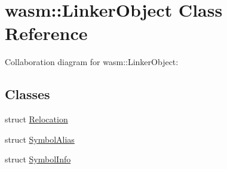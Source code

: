 \hypertarget{classwasm_1_1_linker_object}{}\section{wasm\+:\+:Linker\+Object Class Reference}
\label{classwasm_1_1_linker_object}


Collaboration diagram for wasm\+:\+:Linker\+Object\+:
\subsection*{Classes}
\begin{DoxyCompactItemize}
\item 
struct \mbox{\hyperlink{structwasm_1_1_linker_object_1_1_relocation}{Relocation}}
\item 
struct \mbox{\hyperlink{structwasm_1_1_linker_object_1_1_symbol_alias}{Symbol\+Alias}}
\item 
struct \mbox{\hyperlink{structwasm_1_1_linker_object_1_1_symbol_info}{Symbol\+Info}}
\end{DoxyCompactItemize}
